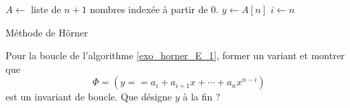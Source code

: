 \begin{algorithm}
  $A\leftarrow$ liste de $n+1$ nombres indexée à partir de $0$.\;
  $y\leftarrow A[n]$\;
  $i\leftarrow n$\;
  \caption{Méthode de Hörner}
  \label{exo_horner_E_1}
\end{algorithm}
Pour la boucle de l'algorithme \ref{exo_horner_E_1}, former un variant et montrer que 
\begin{displaymath}
  \Phi = \left( y == a_i + a_{i+1}x+\cdots +a_nx^{n-i} \right) 
\end{displaymath}
est un invariant de boucle. Que désigne $y$ à la fin ?
